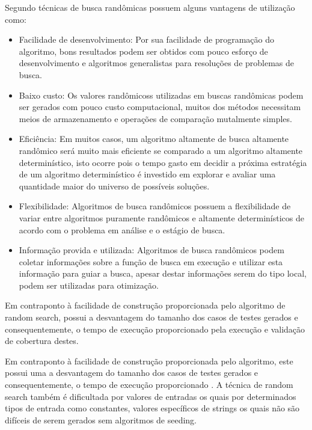 \documentclass[
	12pt,				%
	oneside,			%
	a4paper,			%
	english,			%
	brazil				%
	]{abntex2ppgsi}
\begin{document}
Segundo \cite{Karnopp63} técnicas de busca randômicas possuem alguns vantagens de utilização como:

\begin{itemize}
	\item Facilidade de desenvolvimento: Por sua facilidade de programação do algoritmo, bons resultados podem ser obtidos com pouco esforço de desenvolvimento e algoritmos generalistas para resoluções de problemas de busca.
	\item Baixo custo: Os valores randômicoss utilizadas em buscas randômicas podem ser gerados com pouco custo computacional, muitos dos métodos necessitam meios de armazenamento e operações de comparação mutalmente simples.
	\item Eficiência: Em muitos casos, um algoritmo altamente de busca altamente randômico será muito mais eficiente se comparado a um algoritmo altamente determinístico, isto ocorre pois o tempo gasto em decidir a próxima estratégia de um algoritmo determinístico é investido em explorar e avaliar uma quantidade maior do universo de possíveis soluções.
	\item Flexibilidade: Algoritmos de busca randômicos possuem a flexibilidade de variar entre algoritmos puramente randômicos e altamente determinísticos de acordo com o problema em análise e o estágio de busca.
	\item Informação provida e utilizada: Algoritmos de busca randômicos podem coletar informações sobre a função de busca em execução e utilizar esta informação para guiar a busca, apesar destar informações serem do tipo local, podem ser utilizadas para otimização.
\end{itemize}


Em contraponto à facilidade de construção proporcionada pelo algoritmo de random search, possui a desvantagem do tamanho dos casos de testes gerados e consequentemente, o tempo de execução proporcionado pela execução e validação de cobertura destes. \cite{shamriski20151115}


Em contraponto à facilidade de construção proporcionada pelo algoritmo, este possui uma a desvantagem do tamanho dos casos de testes gerados e consequentemente, o tempo de execução proporcionado \cite{shamriski20151115}. A técnica de random search também é dificultada por valores de entradas os quais por determinados tipos de entrada como constantes, valores específicos de strings os quais não são difíceis de serem gerados sem algoritmos de seeding. \cite{shamriski20151115}
\end{document}
